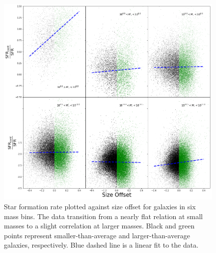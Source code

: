 \documentclass[iop]{emulateapj}
\begin{document}
	

	

\begin{figure}
	\centering
	\includegraphics[width=1.5 \columnwidth]{excess_2x3.png}
	\caption{Star formation rate plotted against size offset for galaxies in six mass bins. The data transition from a nearly flat relation at small masses to a slight correlation at larger masses. Black and green points represent smaller-than-average and larger-than-average galaxies, respectively. Blue dashed line is a linear fit to the data.}
	\label{fig:sfr_ex}
	
\end{figure}
\end{document}
